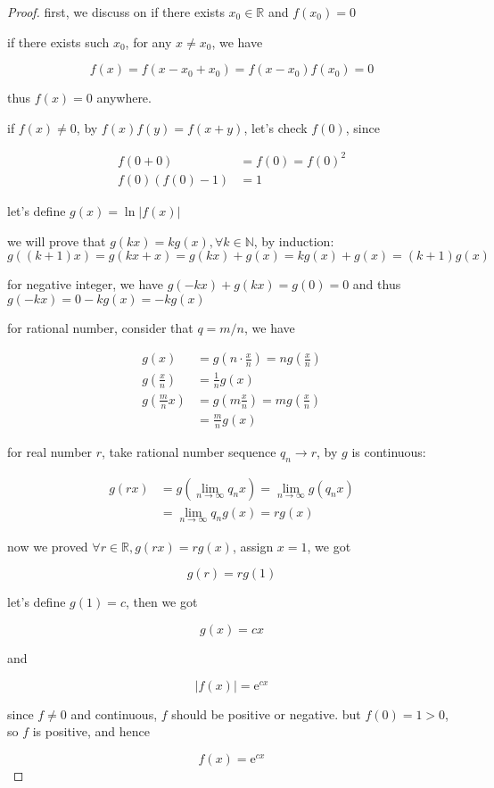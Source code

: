 \begin{proof}
    first, we discuss on if there exists $x_0 \in \mathbb{R}$ and $f(x_0) = 0$

    if there exists such $x_0$, for any $x \ne x_0$, we have

    \[
        f(x) = f(x - x_0 + x_0) = f(x-x_0)f(x_0) = 0
    \]

    thus $f(x) = 0$ anywhere.

    if $f(x) \ne 0$, by $f(x)f(y) = f(x+y)$, let's check $f(0)$, since

    \begin{align*}
        f(0+0) &= f(0) = f(0)^2 \\
        f(0)(f(0)-1) &= 1
    \end{align*}

    let's define $g(x) = \ln \left| f(x)\right|$
    
    we will prove that $g(kx) = kg(x), \forall k \in \mathbb{N}$, by induction:
    $g((k+1)x) = g(kx + x) = g(kx) + g(x) = kg(x) + g(x) = (k+1)g(x) $

    for negative integer, we have $g(-kx) + g(kx) = g(0) = 0$ and thus $g(-kx) = 0- kg(x) = -kg(x)$

    for rational number, consider that $q = m/n$, we have

    \begin{align*}
        g(x) &= g(n \cdot \frac{x}{n}) = n g(\frac{x}{n}) \\
        g(\frac{x}{n}) &= \frac{1}{n}g(x) \\
        g(\frac{m}{n}x) &= g(m \frac{x}{n}) = mg(\frac{x}{n}) \\
        &= \frac{m}{n}g(x)
    \end{align*}

    for real number $r$, take rational number sequence $q_n \to r$, by $g$ is continuous:


    \begin{align*}
        g(rx) &= g(\lim_{n \to \infty} q_n x) = \lim_{n \to \infty}g( q_n x) \\
        &=\lim_{n \to \infty}q_n g( x) =r g(x)
    \end{align*}
    
    now we proved $\forall r \in \mathbb{R}, g(rx) = rg(x)$, assign $x = 1$, we got

    \[
        g(r) = rg(1) 
    \]

    let's define $g(1) = c$, then we got

    \[
        g(x) = cx
    \]

    and

    \[
        \left| f(x)\right| = \mathrm{e}^{cx}
    \]

    since $f \ne 0$ and continuous, $f$ should be positive or negative. but $f(0) = 1 > 0$, so 
    $f$ is positive, and hence

    \[
        f(x) = \mathrm{e}^{cx}
    \]

\end{proof}

